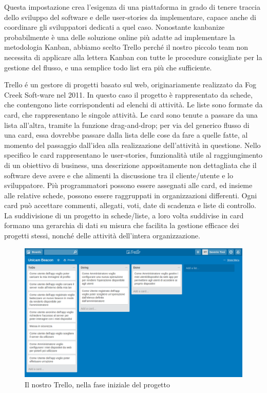 Questa impostazione crea l'esigenza di una piattaforma in grado di tenere traccia dello sviluppo del software e delle user-stories da implementare, capace anche di coordinare gli sviluppatori dedicati a quel caso.
Nonostante kanbanize probabilmente è una delle soluzione online più adatte ad implementare la metodologia Kanban, abbiamo scelto Trello perché il nostro piccolo team non necessita di applicare alla lettera Kanban con tutte le procedure consigliate per la gestione del flusso, e una semplice todo list era più che sufficiente.
 
Trello\cite{trello} é un gestore di progetti basato sul web, originariamente realizzato da Fog Creek Soft-ware nel 2011.
In questo caso il progetto è rappresentato da schede, che contengono liste corrispondenti ad elenchi di attività. 
Le liste sono formate da card, che rappresentano le singole attività. 
Le card sono tenute a passare da una lista all'altra, tramite la funzione drag-and-drop; per via del generico flusso di una card, essa dovrebbe passare dalla lista delle cose da fare a quelle fatte, al momento del passaggio dall'idea alla realizzazione dell'attività in questione.
Nello specifico le card rappresentano le user-stories, funzionalità utile al raggiungimento di un obiettivo di business, una descrizione appositamente non dettagliata che il software deve avere e che alimenti la discussione tra il cliente/utente e lo sviluppatore.
Più programmatori possono essere assegnati alle card, ed insieme alle relative schede, possono essere raggruppati in organizzazioni differenti. 
Ogni card può accettare commenti, allegati, voti, date di scadenza e liste di controllo.
La suddivisione di un progetto in schede/liste, a loro volta suddivise in card formano una gerarchia di dati su misura che facilita la gestione efficace dei progetti stessi, nonché delle attività dell'intera organizzazione.
\begin{figure}[h]
\centering
\includegraphics[scale=0.35]{Immagini/trello.png} 
\caption{Il nostro Trello, nella fase iniziale del progetto}
\end{figure}

